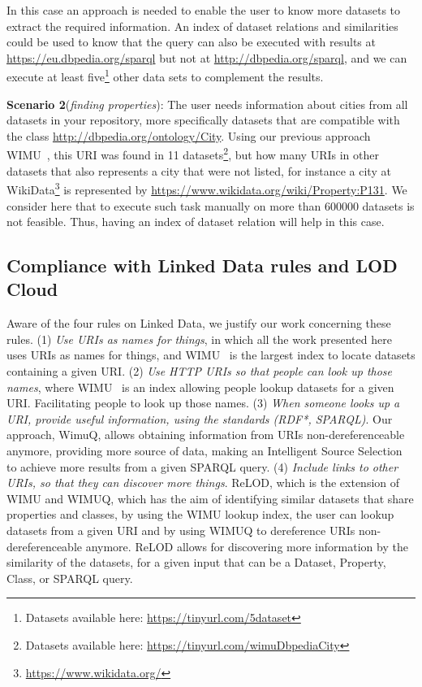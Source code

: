 \documentclass[sw]{iosart2x}
\begin{document}
In this case an approach is needed to enable the user to know more datasets to extract the required information. An index of dataset relations and similarities could be used to know that the query can also be executed with results at \url{https://eu.dbpedia.org/sparql} but not at \url{http://dbpedia.org/sparql}, and we can execute at least five\footnote{Datasets available here: \url{https://tinyurl.com/5dataset}} other data sets to complement the results.

\textbf{Scenario 2}(\textit{finding properties}): The user needs information about cities from all datasets in your repository, more specifically datasets that are compatible with the class \url{http://dbpedia.org/ontology/City}.
Using our previous approach WIMU~\cite{valdestilhas2018my}, this URI was found in 11 datasets\footnote{Datasets available here: \url{https://tinyurl.com/wimuDbpediaCity}}, but how many URIs in other datasets that also represents a city that were not listed, for instance a city at WikiData\footnote{\url{https://www.wikidata.org/}} is represented by  \url{https://www.wikidata.org/wiki/Property:P131}.
We consider here that to execute such task manually on more than \num{600000} datasets is not feasible.
Thus, having an index of dataset relation will help in this case.

\subsection{Compliance with Linked Data rules and LOD Cloud}
Aware of the four rules on Linked Data\cite{designissues-linkeddata}, we justify our work concerning these rules.%
(1) \textit{Use URIs as names for things}, in which all the work presented here uses URIs as names for things, and WIMU~\cite{valdestilhas2018my} is the largest index to locate datasets containing a given URI.
(2) \textit{Use HTTP URIs so that people can look up those names}, where WIMU~\cite{valdestilhas2018my} is an index allowing people lookup datasets for a given URI. Facilitating people to look up those names. (3) \textit{When someone looks up a URI, provide useful information, using the standards (RDF*, SPARQL)}. Our approach, WimuQ\cite{valdestilhas2019more}, allows obtaining information from URIs non-dereferenceable anymore, providing more source of data, making an Intelligent Source Selection to achieve more results from a given SPARQL query. (4) \textit{Include links to other URIs, so that they can discover more things}. ReLOD, which is the extension of WIMU and WIMUQ, which has the aim of identifying similar datasets that share properties and classes, by using the WIMU lookup index, the user can lookup datasets from a given URI and by using WIMUQ to dereference URIs non-dereferenceable anymore. ReLOD allows for discovering more information by the similarity of the datasets, for a given input that can be a Dataset, Property, Class, or SPARQL query.
\end{document}
